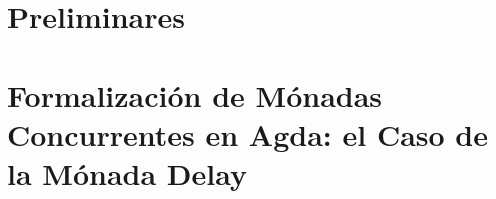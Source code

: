 \documentclass[a4paper,spanish,fixlanguage]{book}
\begin{document}

\thispagestyle{empty}


\thispagestyle{empty}

\frontmatter

\setcounter{tocdepth}{1}
\tableofcontents

\mainmatter



\part{Preliminares}\label{part:pre}





\part{Formalización de Mónadas Concurrentes en Agda: el Caso de la Mónada Delay}\label{part:mc}

 










\begin{appendices}


\end{appendices}
\end{document}
